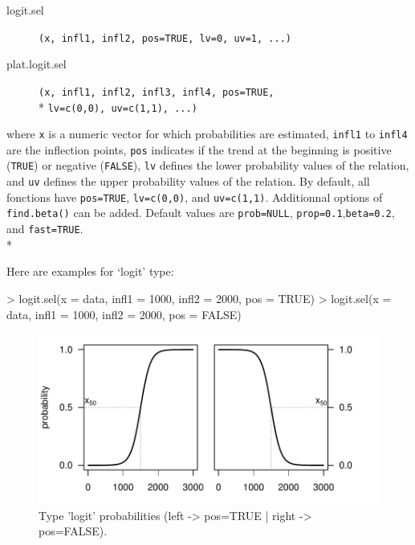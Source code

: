 \documentclass[letterpaper, 12pt]{article}
\begin{document}
\begin{description}
\item[logit.sel]\verb#(x, infl1, infl2, pos=TRUE, lv=0, uv=1, ...)#
\item[plat.logit.sel]\verb#(x, infl1, infl2, infl3, infl4, pos=TRUE,# \\* \verb#lv=c(0,0), uv=c(1,1), ...)#
\end{description}
where \verb#x# is a numeric vector for which probabilities are estimated, \verb#infl1# to \verb#infl4# are the inflection points,  \verb#pos# indicates if the trend at the beginning is positive  (\verb#TRUE#) or negative (\verb#FALSE#), \verb#lv# defines the 
lower probability values of the relation, and \verb#uv# defines the upper probability values of the relation. By default, 
all fonctions have \verb#pos=TRUE#, \verb#lv=c(0,0)#, and \verb#uv=c(1,1)#. Additionnal options of \verb#find.beta()# 
can be added. Default values are \verb#prob=NULL#, \verb#prop=0.1#,\verb#beta=0.2#, and \verb#fast=TRUE#.  \\*

Here are examples for `logit' type:
\begin{Schunk}
\begin{Sinput}
> logit.sel(x = data, infl1 = 1000, infl2 = 2000, pos = TRUE)
> logit.sel(x = data, infl1 = 1000, infl2 = 2000, pos = FALSE)
\end{Sinput}
\end{Schunk}
\begin{figure}[h]
\vspace{-20pt}
\begin{center}
\includegraphics{relation_sel-025}
\end{center}
\vspace{-30pt}
\caption{Type 'logit' probabilities (left -> pos=TRUE |  right -> pos=FALSE).}
\vspace{-10pt}
\label{fig12}
\end{figure}
\end{document}

